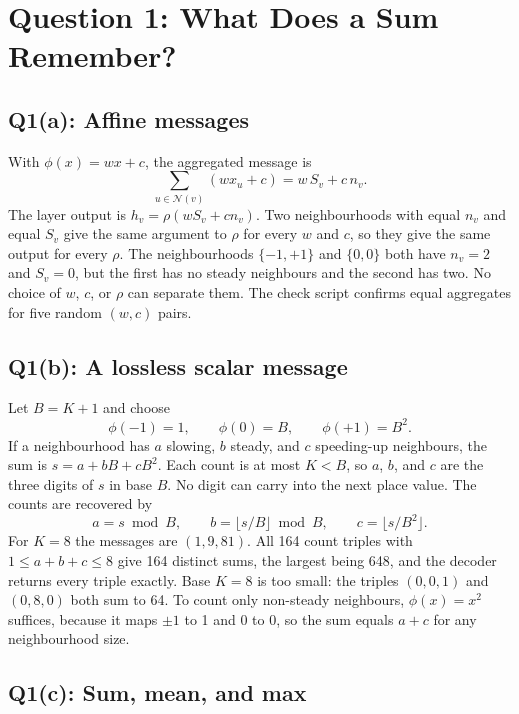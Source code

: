 \documentclass{article}
\begin{document}
\section{Question 1: What Does a Sum Remember?}
\label{sec:q1}

\subsection*{Q1(a): Affine messages}

With $\phi(x)=wx+c$, the aggregated message is
\begin{equation}
  \sum_{u\in\mathcal{N}(v)}\left(w x_u+c\right)=w\,S_v+c\,n_v .
\end{equation}
The layer output is $h_v=\rho(wS_v+cn_v)$. Two neighbourhoods with equal $n_v$ and equal $S_v$ give the same argument to $\rho$ for every $w$ and $c$, so they give the same output for every $\rho$. The neighbourhoods $\{-1,+1\}$ and $\{0,0\}$ both have $n_v=2$ and $S_v=0$, but the first has no steady neighbours and the second has two. No choice of $w$, $c$, or $\rho$ can separate them. The check script confirms equal aggregates for five random $(w,c)$ pairs.

\subsection*{Q1(b): A lossless scalar message}

Let $B=K+1$ and choose
\begin{equation}
  \phi(-1)=1,\qquad \phi(0)=B,\qquad \phi(+1)=B^2 .
\end{equation}
If a neighbourhood has $a$ slowing, $b$ steady, and $c$ speeding-up neighbours, the sum is $s=a+bB+cB^2$. Each count is at most $K<B$, so $a$, $b$, and $c$ are the three digits of $s$ in base $B$. No digit can carry into the next place value. The counts are recovered by
\begin{equation}
  a=s \bmod B,\qquad b=\lfloor s/B\rfloor \bmod B,\qquad c=\lfloor s/B^2\rfloor .
\end{equation}
For $K=8$ the messages are $(1,9,81)$. All 164 count triples with $1\le a+b+c\le 8$ give 164 distinct sums, the largest being 648, and the decoder returns every triple exactly. Base $K=8$ is too small: the triples $(0,0,1)$ and $(0,8,0)$ both sum to 64. To count only non-steady neighbours, $\phi(x)=x^2$ suffices, because it maps $\pm1$ to 1 and 0 to 0, so the sum equals $a+c$ for any neighbourhood size.

\subsection*{Q1(c): Sum, mean, and max}
\end{document}

